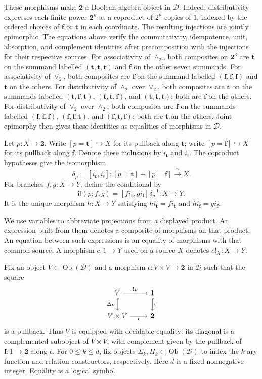 \documentclass[11pt]{article}
\theoremstyle{definition}\newtheorem{definition}[theorem]{Definition}
\newcommand{\Two}{\mathbf 2}
\begin{document}
These morphisms make $\Two$ a Boolean algebra object in $\mathcal D$.
Indeed, distributivity expresses each finite power $\Two^n$ as a
coproduct of $2^n$ copies of $1$, indexed by the ordered choices of
$\mathbf{f}$ or $\mathbf{t}$ in each coordinate. The resulting
injections are jointly epimorphic. The equations above verify the
commutativity, idempotence, unit, absorption, and complement identities
after precomposition with the injections for their respective sources.
For associativity of $\wedge_2$, both composites on $\Two^3$ are
$\mathbf{t}$ on the summand labelled $(\mathbf{t},\mathbf{t},\mathbf{t})$
and $\mathbf{f}$ on the other seven summands. For associativity of
$\vee_2$, both composites are $\mathbf{f}$ on the summand labelled
$(\mathbf{f},\mathbf{f},\mathbf{f})$ and $\mathbf{t}$ on the others.
For distributivity of $\wedge_2$ over $\vee_2$, both composites are
$\mathbf{t}$ on the summands labelled
$(\mathbf{t},\mathbf{f},\mathbf{t})$,
$(\mathbf{t},\mathbf{t},\mathbf{f})$, and
$(\mathbf{t},\mathbf{t},\mathbf{t})$; both are $\mathbf{f}$ on the others.
For distributivity of $\vee_2$ over $\wedge_2$, both composites are
$\mathbf{f}$ on the summands labelled
$(\mathbf{f},\mathbf{f},\mathbf{f})$,
$(\mathbf{f},\mathbf{f},\mathbf{t})$, and
$(\mathbf{f},\mathbf{t},\mathbf{f})$; both are $\mathbf{t}$ on the others.
Joint epimorphy then gives these identities as equalities of morphisms
in $\mathcal D$.

Let $p:X\to\Two$. Write $[p=\mathbf{t}]\hookrightarrow X$ for its
pullback along $\mathbf{t}$; write $[p=\mathbf{f}]\hookrightarrow X$ for its
pullback along $\mathbf{f}$.
Denote these inclusions by $i_{\mathbf{t}}$ and $i_{\mathbf{f}}$.
The coproduct hypotheses give the isomorphism
\[
 \delta_p=[i_{\mathbf{t}},i_{\mathbf{f}}]:
 [p=\mathbf{t}]+[p=\mathbf{f}]\xrightarrow{\cong}X.
\]
For branches $f,g:X\to Y$, define the conditional by
\[
 \mathsf{if}(p;f,g)=
 [f i_{\mathbf{t}},g i_{\mathbf{f}}]\delta_p^{-1}:X\to Y.
\]
It is the unique morphism $h:X\to Y$ satisfying
$h i_{\mathbf{t}}=f i_{\mathbf{t}}$ and
$h i_{\mathbf{f}}=g i_{\mathbf{f}}$.

We use variables to abbreviate projections from a displayed product.
An expression built from them denotes a composite of morphisms on
that product. An equation between such expressions is an equality
of morphisms with that common source. A morphism $c:1\to Y$ used
on a source $X$ denotes $c!_X:X\to Y$.

Fix an object $V\in\operatorname{Ob}(\mathcal D)$ and a morphism
$\epsilon:V\times V\to\Two$ in $\mathcal D$ such that the square
\[
\begin{tikzcd}
 V\arrow[r,"{!_V}"]\arrow[d,hook,"\Delta_V"'] &
 1\arrow[d,hook,"\mathbf{t}"]\\
 V\times V\arrow[r,"\epsilon"'] & \Two
\end{tikzcd}
\]
is a pullback. Thus $V$ is equipped with decidable equality:
its diagonal is a complemented subobject of $V\times V$, with
complement given by the pullback of $\mathbf{f}:1\to\Two$
along $\epsilon$.
For $0\leq k\leq d$, fix objects
$\Sigma_k,\Pi_k\in\operatorname{Ob}(\mathcal D)$ to index the
$k$-ary function and relation constructors, respectively.
Here $d$ is a fixed nonnegative integer. Equality is a logical symbol.
\end{document}
